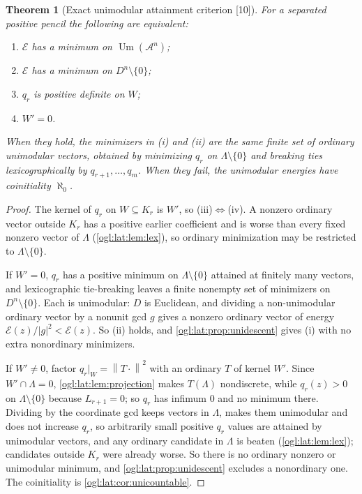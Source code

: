 \documentclass[11pt,oneside]{article}
\numberwithin{equation}{section}
\newtheorem{theorem}{Theorem}[section]
\theoremstyle{definition}
\theoremstyle{remark}
\newcommand{\A}{\mathcal A}
\newcommand{\cE}{\mathcal E}
\newcommand{\Um}{\operatorname{Um}}
\newcommand{\norm}[1]{\left\lVert #1\right\rVert}
\newcommand{\src}[1]{\textup{\textsf{\small[#1]}}}
\begin{document}
\begin{theorem}[Exact unimodular attainment criterion \src{10}]\label{ogl:lat:thm:unimodular}
For a separated positive pencil the following are equivalent:
\begin{enumerate}
\item $\cE$ has a minimum on $\Um(\A^n)$;
\item $\cE$ has a minimum on $D^n\setminus\{0\}$;
\item $q_r$ is positive definite on $W$;
\item $W'=0$.
\end{enumerate}
When they hold, the minimizers in (i) and (ii) are the same finite set of
ordinary unimodular vectors, obtained by minimizing $q_r$ on $\Lambda\setminus\{0\}$
and breaking ties lexicographically by $q_{r+1},\dots,q_m$. When they fail, the
unimodular energies have coinitiality $\aleph_0$.
\end{theorem}
\begin{proof}
The kernel of $q_r$ on $W\subseteq K_r$ is $W'$, so (iii)$\Leftrightarrow$(iv).
A nonzero ordinary vector outside $K_r$ has a positive earlier coefficient and
is worse than every fixed nonzero vector of $\Lambda$ (\cref{ogl:lat:lem:lex}), so
ordinary minimization may be restricted to $\Lambda\setminus\{0\}$.

If $W'=0$, $q_r$ has a positive minimum on $\Lambda\setminus\{0\}$ attained at
finitely many vectors, and lexicographic tie-breaking leaves a finite nonempty
set of minimizers on $D^n\setminus\{0\}$. Each is unimodular: $D$ is Euclidean,
and dividing a non-unimodular ordinary vector by a nonunit gcd $g$ gives a
nonzero ordinary vector of energy $\cE(z)/|g|^2<\cE(z)$. So (ii) holds, and
\cref{ogl:lat:prop:unidescent} gives (i) with no extra nonordinary minimizers.

If $W'\ne0$, factor $q_r|_W=\norm{T\cdot}^2$ with an ordinary $T$ of kernel $W'$.
Since $W'\cap\Lambda=0$, \cref{ogl:lat:lem:projection} makes $T(\Lambda)$
nondiscrete, while $q_r(z)>0$ on $\Lambda\setminus\{0\}$ because $L_{r+1}=0$; so
$q_r$ has infimum $0$ and no minimum there. Dividing by the coordinate gcd keeps
vectors in $\Lambda$, makes them unimodular and does not increase $q_r$, so
arbitrarily small positive $q_r$ values are attained by unimodular vectors, and
any ordinary candidate in $\Lambda$ is beaten (\cref{ogl:lat:lem:lex}); candidates
outside $K_r$ were already worse. So there is no ordinary nonzero or unimodular
minimum, and \cref{ogl:lat:prop:unidescent} excludes a nonordinary one. The
coinitiality is \cref{ogl:lat:cor:unicountable}.
\end{proof}
\end{document}
